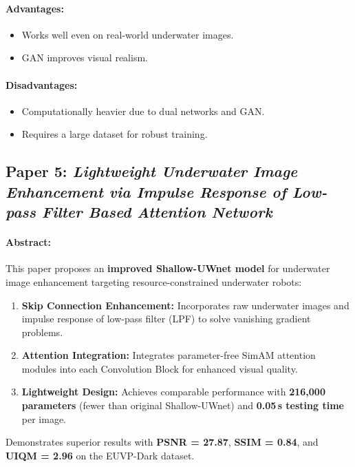 \documentclass{article}
\begin{document}
\paragraph{Advantages:}
\begin{itemize}
    \item Works well even on real-world underwater images.
    \item GAN improves visual realism.

\end{itemize}

\paragraph{Disadvantages:}
\begin{itemize}
    \item Computationally heavier due to dual networks and GAN.
    \item Requires a large dataset for robust training.
\end{itemize}

\subsection{Paper 5: \textit{Lightweight Underwater Image Enhancement via Impulse Response of Low-pass Filter Based Attention Network}}

\paragraph{Abstract:}
This paper proposes an \textbf{improved Shallow-UWnet model} for underwater image enhancement targeting resource-constrained underwater robots:
\begin{enumerate}
    \item \textbf{Skip Connection Enhancement:} Incorporates raw underwater images and impulse response of low-pass filter (LPF) to solve vanishing gradient problems.
    \item \textbf{Attention Integration:} Integrates parameter-free SimAM attention modules into each Convolution Block for enhanced visual quality.
    \item \textbf{Lightweight Design:} Achieves comparable performance with \textbf{216,000 parameters} (fewer than original Shallow-UWnet) and \textbf{0.05\,s testing time} per image.
\end{enumerate}
Demonstrates superior results with \textbf{PSNR = 27.87}, \textbf{SSIM = 0.84}, and \textbf{UIQM = 2.96} on the EUVP-Dark dataset.
\end{document}

